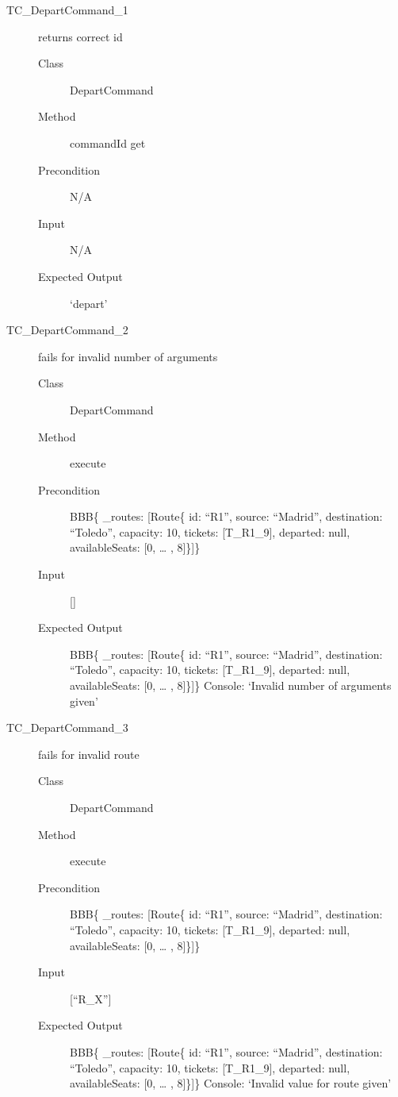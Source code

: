 \documentclass[11pt]{article}
\begin{document}
\begin{description}
\item[{TC\_DepartCommand\_1}] returns correct id
\begin{description}
\item[{Class}] DepartCommand
\item[{Method}] commandId get
\item[{Precondition}] N/A
\item[{Input}] N/A
\item[{Expected Output}] ‘depart’
\end{description}

\item[{TC\_DepartCommand\_2}] fails for invalid number of arguments
\begin{description}
\item[{Class}] DepartCommand
\item[{Method}] execute
\item[{Precondition}] BBB\{ \_routes: [Route\{ id: “R1”, source: “Madrid”, destination: “Toledo”, capacity: 10,  tickets: [T\_R1\_9], departed: null, availableSeats: [0, … , 8]\}]\}
\item[{Input}] []
\item[{Expected Output}] BBB\{ \_routes: [Route\{ id: “R1”, source: “Madrid”, destination: “Toledo”, capacity: 10,  tickets: [T\_R1\_9], departed: null, availableSeats: [0, … , 8]\}]\}
Console: ‘Invalid number of arguments given’
\end{description}

\item[{TC\_DepartCommand\_3}] fails for invalid route
\begin{description}
\item[{Class}] DepartCommand
\item[{Method}] execute
\item[{Precondition}] BBB\{ \_routes: [Route\{ id: “R1”, source: “Madrid”, destination: “Toledo”, capacity: 10,  tickets: [T\_R1\_9], departed: null, availableSeats: [0, … , 8]\}]\}
\item[{Input}] [“R\_X”]
\item[{Expected Output}] BBB\{ \_routes: [Route\{ id: “R1”, source: “Madrid”, destination: “Toledo”, capacity: 10,  tickets: [T\_R1\_9], departed: null, availableSeats: [0, … , 8]\}]\}
Console: ‘Invalid value for route given’
\end{description}


\end{description}
\end{document}
